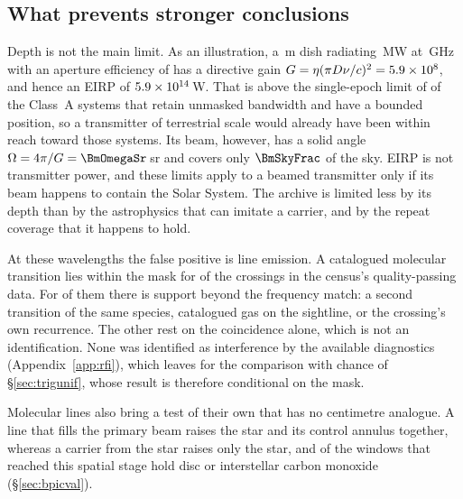 \subsection{What prevents stronger conclusions}
\label{sec:mmdifferent}

Depth is not the main limit. As an illustration, a \BenchDiam\,m dish
radiating \BenchPowerMW\,MW at \BenchFreqGHz\,GHz with an aperture efficiency
of \BenchEta{} has a directive gain $G=\eta(\pi D\nu/c)^{2}=5.9\times10^{8}$, and
hence an EIRP of $5.9\times10^{14}$\,W. That is above the single-epoch limit of
\BenchNSysABnd{} of the \NSysALimSum{} Class~A systems that retain unmasked
bandwidth and have a bounded position, so a transmitter of terrestrial scale would already have been
within reach toward those systems. Its beam, however, has a solid
angle $\Omega=4\pi/G=\BmOmegaSr$\,sr and covers only $\BmSkyFrac$ of the sky.
EIRP is not transmitter power, and these limits apply to a beamed
transmitter only if its beam happens to contain the Solar System. The
archive is limited less by its depth than by the astrophysics that can
imitate a carrier, and by the repeat coverage that it happens to hold.

At these wavelengths the false positive is line emission. A
catalogued molecular transition lies within the mask for \CsNAttrQp{} of the
\CsNCrossQp{} crossings in the census's quality-passing data. For
\LnAttrSupp{} of them there is support beyond the frequency match: a second
transition of the same species, catalogued gas on the sightline, or the
crossing's own recurrence. The other \LnAttrCoincWord{} rest on the
coincidence alone, which is not an identification. None was identified as
interference by the available diagnostics (Appendix~\ref{app:rfi}), which
leaves \CsNUnattrQp{} for the comparison with chance of \S\ref{sec:trigunif},
whose result is therefore conditional on the mask.

Molecular lines also bring a test of their own that has no centimetre
analogue. A line that fills the primary beam raises the star and its control
annulus together, whereas a carrier from the star raises only the star, and
\DiscFpWin{} of the \DiscFpOfFlags{} windows that reached this spatial stage
hold disc or interstellar carbon monoxide (\S\ref{sec:bpicval}).

